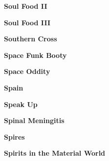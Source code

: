 \newline
\vspace{10pt} 
\begin{center}\textbf{Soul Food II}\end{center}
\newline
\vspace{10pt} 
\begin{center}\textbf{Soul Food III}\end{center}
\newline
\vspace{10pt} 
\begin{center}\textbf{Southern Cross}\end{center}
\newline
\vspace{10pt} 
\begin{center}\textbf{Space Funk Booty}\end{center}
\newline
\vspace{10pt} 
\begin{center}\textbf{Space Oddity}\end{center}
\newline
\vspace{10pt} 
\begin{center}\textbf{Spain}\end{center}
\newline
\vspace{10pt} 
\begin{center}\textbf{Speak Up}\end{center}
\newline
\vspace{10pt} 
\begin{center}\textbf{Spinal Meningitis}\end{center}
\newline
\vspace{10pt} 
\begin{center}\textbf{Spires}\end{center}
\newline
\vspace{10pt} 
\begin{center}\textbf{Spirits in the Material World}\end{center}
